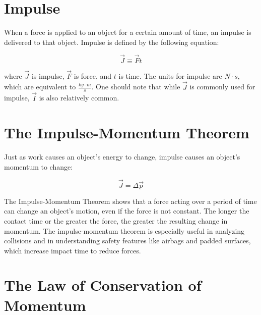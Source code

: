 	 
	\section{Impulse} \label{impulse} 
		When a force is applied to an object for a certain amount of time, an \gls{impulse} is delivered to that object.  Impulse is defined by the following equation:
	\begin{mdframed}[backgroundcolor=orange!20!white]
		\begin{equation}
		\vec{J} \equiv \vec{F} t 
		\label{eqn:Impulse}
		\end{equation}
	\end{mdframed}
	where $\vec{J}$ is impulse, $\vec{F}$ is force, and $t $ is time.  The units for impulse are $\si{N\cdot s}$, which are equivalent to $ \si{\frac{kg \cdot m}{s}}$.  One should note that while $\vec{J}$ is commonly used for impulse, $\vec{I}$ is also relatively common.  
	
	
	
	
	
	\section{The Impulse-Momentum Theorem} 
	
	Just as work causes an object's energy to change, impulse causes an object's momentum to change:
	
		\begin{mdframed}[backgroundcolor=orange!20!white]
		\begin{equation}
		\vec{J} = \Delta \vec{p} 
		\label{eqn:ImpulseMomentumTheorum}
		\end{equation}
	\end{mdframed}
	
	The Impulse-Momentum Theorem shows that a force acting over a period of time can change an object’s motion, even if the force is not constant. The longer the contact time or the greater the force, the greater the resulting change in momentum. The impulse-momentum theorem is especially useful in analyzing collisions and in understanding safety features like airbags and padded surfaces, which increase impact time to reduce forces.	
	
	
	\section{The Law of Conservation of Momentum}
	
